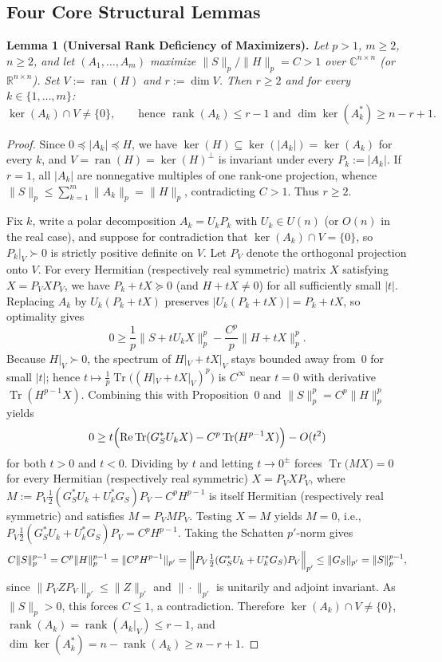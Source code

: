 \documentclass[10pt,letterpaper]{article}
\newcommand{\C}{\mathbb{C}}
\newcommand{\R}{\mathbb{R}}
\newcommand{\Tr}{\operatorname{Tr}}
\newcommand{\ran}{\operatorname{ran}}
\newcommand{\rank}{\operatorname{rank}}
\begin{document}
\subsection{Four Core Structural Lemmas}

\begin{tcolorbox}[lemmabox]
\textbf{Lemma 1 (Universal Rank Deficiency of Maximizers).}
\emph{Let $p > 1$, $m \ge 2$, $n \ge 2$, and let $(A_1,\dots,A_m)$ maximize $\|S\|_p / \|H\|_p = C > 1$ over $\C^{n\times n}$ (or $\R^{n\times n}$). Set $V := \ran(H)$ and $r := \dim V$. Then $r \ge 2$ and for every $k \in \{1,\dots,m\}$:}
\[
  \ker(A_k) \cap V \neq \{0\}, \qquad \text{hence } \rank(A_k) \le r - 1 \text{ and } \dim\ker(A_k^*) \ge n - r + 1.
\]
\end{tcolorbox}

\begin{proof}
Since $0 \preceq |A_k| \preceq H$, we have $\ker(H) \subseteq \ker(|A_k|) = \ker(A_k)$ for every $k$, and $V = \ran(H) = \ker(H)^\perp$ is invariant under every $P_k := |A_k|$. If $r = 1$, all $|A_k|$ are nonnegative multiples of one rank-one projection, whence $\|S\|_p \le \sum_{k=1}^m \|A_k\|_p = \|H\|_p$, contradicting $C > 1$. Thus $r \ge 2$.

Fix $k$, write a polar decomposition $A_k = U_k P_k$ with $U_k \in U(n)$ (or $O(n)$ in the real case), and suppose for contradiction that $\ker(A_k) \cap V = \{0\}$, so $P_k|_V \succ 0$ is strictly positive definite on $V$. Let $P_V$ denote the orthogonal projection onto $V$. For every Hermitian (respectively real symmetric) matrix $X$ satisfying $X = P_V X P_V$, we have $P_k + tX \succeq 0$ (and $H + tX \neq 0$) for all sufficiently small $|t|$. Replacing $A_k$ by $U_k(P_k + tX)$ preserves $|U_k(P_k + tX)| = P_k + tX$, so optimality gives
\[
  0 \ge \frac{1}{p}\|S + t U_k X\|_p^p - \frac{C^p}{p}\|H + tX\|_p^p.
\]
Because $H|_V \succ 0$, the spectrum of $H|_V + tX|_V$ stays bounded away from~$0$ for small $|t|$; hence $t \mapsto \frac{1}{p}\Tr\bigl((H|_V + tX|_V)^p\bigr)$ is $C^\infty$ near $t = 0$ with derivative $\Tr(H^{p-1} X)$. Combining this with Proposition~0 and $\|S\|_p^p = C^p \|H\|_p^p$ yields
\[
  0 \ge t\Bigl(\operatorname{Re}\Tr(G_S^* U_k X) - C^p \Tr(H^{p-1} X)\Bigr) - O(t^2)
\]
for both $t > 0$ and $t < 0$. Dividing by $t$ and letting $t \to 0^{\pm}$ forces $\Tr\bigl(M X\bigr) = 0$ for every Hermitian (respectively real symmetric) $X = P_V X P_V$, where $M := P_V\frac{1}{2}(G_S^* U_k + U_k^* G_S)P_V - C^p H^{p-1}$ is itself Hermitian (respectively real symmetric) and satisfies $M = P_V M P_V$. Testing $X = M$ yields $M = 0$, i.e., $P_V\frac{1}{2}(G_S^* U_k + U_k^* G_S)P_V = C^p H^{p-1}$. Taking the Schatten $p'$-norm gives
\[
  C\|S\|_p^{p-1} = C^p \|H\|_p^{p-1} = \|C^p H^{p-1}\|_{p'} = \Bigl\|P_V\tfrac{1}{2}(G_S^* U_k + U_k^* G_S)P_V\Bigr\|_{p'} \le \|G_S\|_{p'} = \|S\|_p^{p-1},
\]
since $\|P_V Z P_V\|_{p'} \le \|Z\|_{p'}$ and $\|\cdot\|_{p'}$ is unitarily and adjoint invariant. As $\|S\|_p > 0$, this forces $C \le 1$, a contradiction. Therefore $\ker(A_k) \cap V \neq \{0\}$, $\rank(A_k) = \rank(A_k|_V) \le r - 1$, and $\dim\ker(A_k^*) = n - \rank(A_k) \ge n - r + 1$.
\end{proof}
\end{document}
